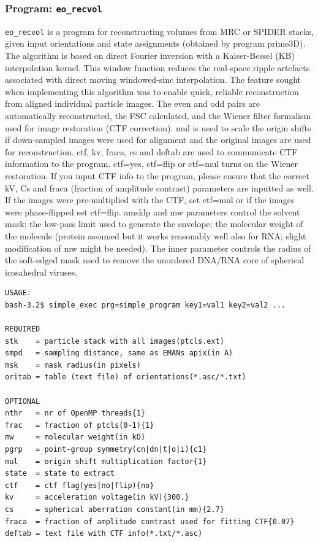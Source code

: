 \documentclass[a4paper,11pt]{article}
\newcommand{\prgname}[1]{\textcolor{NavyBlue}{\texttt{#1}}}
\begin{document}
\subsubsection{Program: \prgname{eo\_recvol}}
\label{eo_recvol}
\prgname{eo\_recvol} is a program for reconstructing volumes from MRC or SPIDER stacks, given input orientations and state assignments (obtained by program prime3D). The algorithm is based on direct Fourier inversion with a Kaiser-Bessel (KB) interpolation kernel. This window function reduces the real-space ripple artefacts associated with direct moving windowed-sinc interpolation. The feature sought when implementing this algorithm was to enable quick, reliable reconstruction from aligned individual particle images. The even and odd pairs are automatically reconstructed, the FSC calculated, and the Wiener filter formalism used for image restoration (CTF correction). mul is used to scale the origin shifts if down-sampled images were used for alignment and the original images are used for reconstruction. ctf, kv, fraca, cs and deftab are used to communicate CTF information to the program. ctf=yes, ctf=flip or ctf=mul turns on the Wiener restoration. If you input CTF info to the program, please ensure that the correct kV, Cs and fraca (fraction of amplitude contrast) parameters are inputted as well. If the images were pre-multiplied with the CTF, set ctf=mul or if the images were phase-flipped set ctf=flip. amsklp and mw parameters control the solvent mask: the low-pass limit used to generate the envelope; the molecular weight of the molecule (protein assumed but it works reasonably well also for RNA; slight modification of mw might be needed). The inner parameter controls the radius of the soft-edged mask used to remove the unordered DNA/RNA core of spherical icosahedral viruses.

\begin{verbatim}
USAGE:
bash-3.2$ simple_exec prg=simple_program key1=val1 key2=val2 ...

REQUIRED
stk    = particle stack with all images(ptcls.ext)
smpd   = sampling distance, same as EMANs apix(in A)
msk    = mask radius(in pixels)
oritab = table (text file) of orientations(*.asc/*.txt)

OPTIONAL
nthr   = nr of OpenMP threads{1}
frac   = fraction of ptcls(0-1){1}
mw     = molecular weight(in kD)
pgrp   = point-group symmetry(cn|dn|t|o|i){c1}
mul    = origin shift multiplication factor{1}
state  = state to extract
ctf    = ctf flag(yes|no|flip){no}
kv     = acceleration voltage(in kV){300.}
cs     = spherical aberration constant(in mm){2.7}
fraca  = fraction of amplitude contrast used for fitting CTF{0.07}
deftab = text file with CTF info(*.txt/*.asc)
\end{verbatim}
\end{document}
